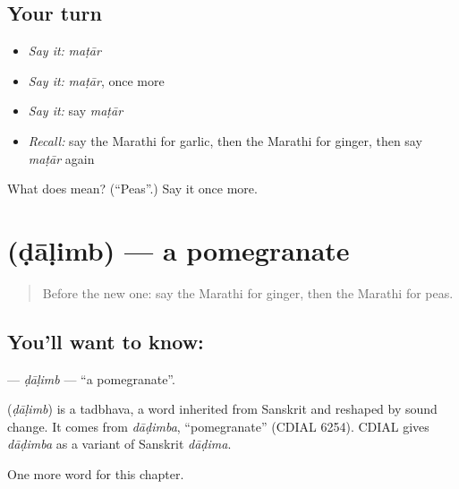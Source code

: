 \subsection*{Your turn}
\begin{itemize}
\raggedright
  \item \emph{Say it:} \emph{maṭār}
  \item \emph{Say it:} \emph{maṭār}, once more
  \item \emph{Say it:} say \emph{maṭār}
  \item \emph{Recall:} say the Marathi for garlic, then the Marathi for ginger, then say \emph{maṭār} again
\end{itemize}

\begin{tcolorbox}[breakable,colback=teal!4,colframe=teal!35!black,title={Before you move on}]
What does  mean? (\textquotedblleft{}Peas\textquotedblright{}.) Say it once more.
\end{tcolorbox}
\section[\texorpdfstring{\mr{डाळिंब} (ḍāḷimb)}{डाळिंब (ḍāḷimb)}]{ (ḍāḷimb) — a pomegranate}

\label{lesson:MR-C138-dalimb}



\begin{quote}
Before the new one: say the Marathi for ginger, then the Marathi for peas.
\end{quote}

\subsection*{You'll want to know: }
\textbf{} — \emph{ḍāḷimb} — \textquotedblleft{}a pomegranate\textquotedblright{}.

\begin{cousinweb}
\textbf{} (\emph{ḍāḷimb}) is a tadbhava, a word inherited from Sanskrit and reshaped by sound change. It comes from \emph{dāḍimba}, \textquotedblleft{}pomegranate\textquotedblright{} (CDIAL 6254). CDIAL gives \emph{dāḍimba} as a variant of Sanskrit \emph{dāḍima}.
\end{cousinweb}

\begin{grammarlens}[title={What you've built}]
One more word for this chapter.
\end{grammarlens}

